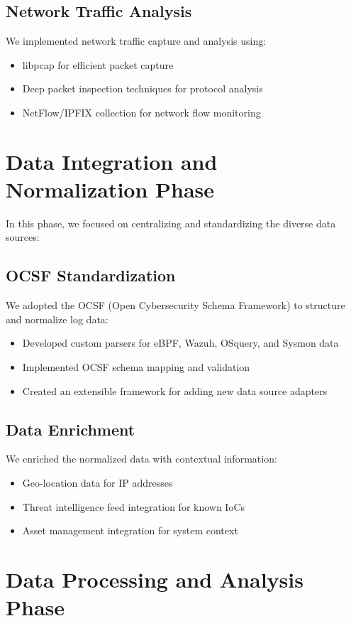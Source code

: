 \subsection{Network Traffic Analysis}
We implemented network traffic capture and analysis using:
\begin{itemize}
    \item libpcap for efficient packet capture
    \item Deep packet inspection techniques for protocol analysis
    \item NetFlow/IPFIX collection for network flow monitoring
\end{itemize}

\section{Data Integration and Normalization Phase}

In this phase, we focused on centralizing and standardizing the diverse data sources:

\subsection{OCSF Standardization}
We adopted the OCSF (Open Cybersecurity Schema Framework) to structure and normalize log data:
\begin{itemize}
    \item Developed custom parsers for eBPF, Wazuh, OSquery, and Sysmon data
    \item Implemented OCSF schema mapping and validation
    \item Created an extensible framework for adding new data source adapters
\end{itemize}

\subsection{Data Enrichment}
We enriched the normalized data with contextual information:
\begin{itemize}
    \item Geo-location data for IP addresses
    \item Threat intelligence feed integration for known IoCs
    \item Asset management integration for system context
\end{itemize}

\section{Data Processing and Analysis Phase}

